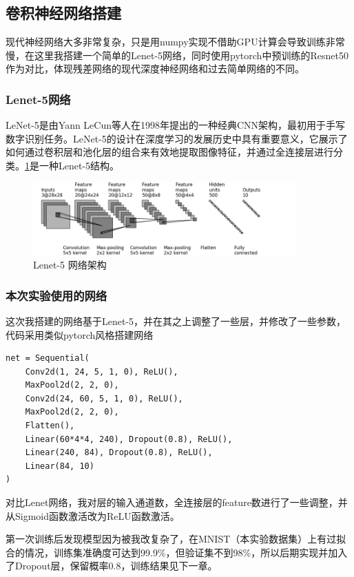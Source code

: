 \subsection{卷积神经网络搭建}

现代神经网络大多非常复杂，只是用numpy实现不借助GPU计算会导致训练非常慢，在这里我搭建一个简单的Lenet-5网络，同时使用pytorch中预训练的Resnet50作为对比，体现残差网络的现代深度神经网络和过去简单网络的不同。

\subsubsection{Lenet-5网络}

LeNet-5是由Yann LeCun等人在1998年提出的一种经典CNN架构\cite{726791}，最初用于手写数字识别任务。LeNet-5的设计在深度学习的发展历史中具有重要意义，它展示了如何通过卷积层和池化层的组合来有效地提取图像特征，并通过全连接层进行分类。\ref{fig3-1}是一种Lenet-5结构。

\begin{figure}[h!]
    \centering
    \includegraphics[width=0.9\textwidth]{figure/Lenet-5.png}
    \caption{Lenet-5 网络架构}
    \label{fig3-1}
\end{figure}

\subsubsection{本次实验使用的网络}

这次我搭建的网络基于Lenet-5，并在其之上调整了一些层，并修改了一些参数，代码采用类似pytorch风格搭建网络

\begin{lstlisting}
net = Sequential(
    Conv2d(1, 24, 5, 1, 0), ReLU(),
    MaxPool2d(2, 2, 0),
    Conv2d(24, 60, 5, 1, 0), ReLU(),
    MaxPool2d(2, 2, 0),
    Flatten(),
    Linear(60*4*4, 240), Dropout(0.8), ReLU(),
    Linear(240, 84), Dropout(0.8), ReLU(),
    Linear(84, 10)
)
\end{lstlisting}

对比Lenet网络，我对层的输入通道数，全连接层的feature数进行了一些调整，并从Sigmoid函数激活改为ReLU函数激活。

第一次训练后发现模型因为被我改复杂了，在MNIST（本实验数据集）上有过拟合的情况，训练集准确度可达到99.9\%，但验证集不到98\%，所以后期实现并加入了Dropout层，保留概率0.8，训练结果见下一章。

